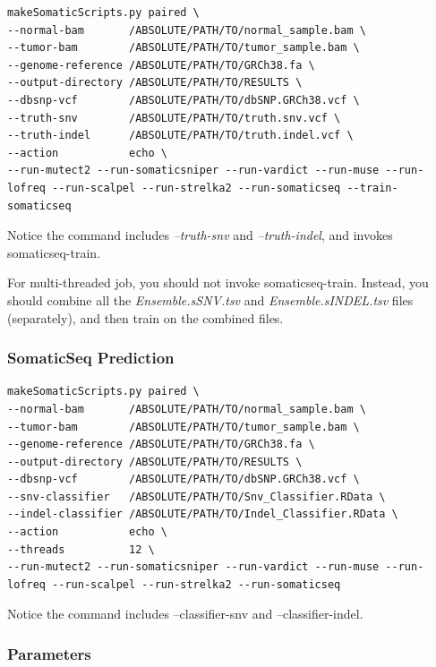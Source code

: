 \documentclass[10pt,letterpaper]{article}
\begin{document}
\begin{sloppypar}
\begin{lstlisting}
makeSomaticScripts.py paired \
--normal-bam       /ABSOLUTE/PATH/TO/normal_sample.bam \
--tumor-bam        /ABSOLUTE/PATH/TO/tumor_sample.bam \
--genome-reference /ABSOLUTE/PATH/TO/GRCh38.fa \
--output-directory /ABSOLUTE/PATH/TO/RESULTS \
--dbsnp-vcf        /ABSOLUTE/PATH/TO/dbSNP.GRCh38.vcf \
--truth-snv        /ABSOLUTE/PATH/TO/truth.snv.vcf \
--truth-indel      /ABSOLUTE/PATH/TO/truth.indel.vcf \
--action           echo \
--run-mutect2 --run-somaticsniper --run-vardict --run-muse --run-lofreq --run-scalpel --run-strelka2 --run-somaticseq --train-somaticseq
\end{lstlisting}

Notice the command includes \textit{--truth-snv} and \textit{--truth-indel}, and invokes somaticseq-train.

For multi-threaded job, you should not invoke somaticseq-train. Instead, you should combine all the \textit{Ensemble.sSNV.tsv} and \textit{Ensemble.sINDEL.tsv} files (separately), and then train on the combined files. 




\subsubsection{SomaticSeq Prediction}

\begin{lstlisting}
makeSomaticScripts.py paired \
--normal-bam       /ABSOLUTE/PATH/TO/normal_sample.bam \
--tumor-bam        /ABSOLUTE/PATH/TO/tumor_sample.bam \
--genome-reference /ABSOLUTE/PATH/TO/GRCh38.fa \
--output-directory /ABSOLUTE/PATH/TO/RESULTS \
--dbsnp-vcf        /ABSOLUTE/PATH/TO/dbSNP.GRCh38.vcf \
--snv-classifier   /ABSOLUTE/PATH/TO/Snv_Classifier.RData \
--indel-classifier /ABSOLUTE/PATH/TO/Indel_Classifier.RData \
--action           echo \
--threads          12 \
--run-mutect2 --run-somaticsniper --run-vardict --run-muse --run-lofreq --run-scalpel --run-strelka2 --run-somaticseq
\end{lstlisting}

Notice the command includes --classifier-snv and --classifier-indel.





\subsubsection{Parameters}


\end{sloppypar}
\end{document}
